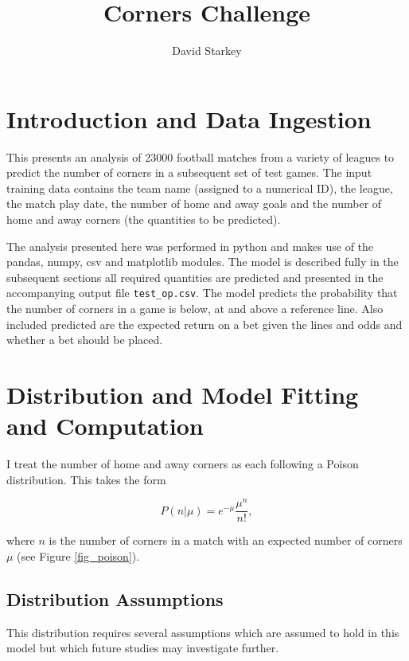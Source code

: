 \documentclass[10pt]{article}
\begin{document}
\title{Corners Challenge}

\author{David Starkey}

\maketitle





\section{Introduction and Data Ingestion}

This presents an analysis of 23000 football matches from a variety of leagues to predict the number of corners in a subsequent set of test games. The input training data contains the team name (assigned to a numerical ID), the league, the match play date, the number of home and away goals and the number of home and away corners (the quantities to be predicted).

The analysis presented here was performed in python and makes use of the pandas, numpy, csv and matplotlib modules. The model is described fully in the subsequent sections all required quantities are predicted and presented in the accompanying output file \verb|test_op.csv|. The model predicts the probability that the number of corners in a game is below, at and above a reference line. Also included predicted are the expected return on a bet given the lines and odds and whether a bet should be placed.




\section{Distribution and Model Fitting and Computation}
\label{sec_method}


I treat the number of home and away corners as each following a Poison distribution. This takes the form

\begin{equation}
P(n|\mu) = e^{-\mu}\frac{\mu^n}{n!},
\end{equation}

\noindent where $n$ is the number of corners in a match with an expected number of corners $\mu$ (see Figure \ref{fig_poison}).


\subsection{Distribution Assumptions}
This distribution requires several assumptions which are assumed to hold in this model but which future studies may investigate further. 
\end{document}
